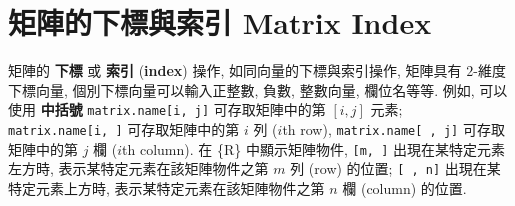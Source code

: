 \documentclass[
]{book}
\begin{document}
\hypertarget{ux77e9ux9663ux7684ux4e0bux6a19ux8207ux7d22ux5f15-matrix-index}{%
\section{矩陣的下標與索引 Matrix Index}\label{ux77e9ux9663ux7684ux4e0bux6a19ux8207ux7d22ux5f15-matrix-index}}

矩陣的
\textbf{下標}
或
\textbf{索引}
(\textbf{index})
操作,
如同向量的下標與索引操作,
矩陣具有 \(2\)-維度下標向量,
個別下標向量可以輸入正整數, 負數, 整數向量, 欄位名等等.
例如, 可以使用
\textbf{中括號}
\texttt{matrix.name{[}i,\ j{]}}
可存取矩陣中的第 \([i, j]\) 元素;
\texttt{matrix.name{[}i,\ {]}}
可存取矩陣中的第 \(i\) 列 (\(i\)th row),
\texttt{matrix.name{[}\ ,\ j{]}}
可存取矩陣中的第 \(j\) 欄 (\(i\)th column).
在 \{R\} 中顯示矩陣物件,
\texttt{{[}m,\ {]}}
出現在某特定元素左方時,
表示某特定元素在該矩陣物件之第 \(m\) 列 (row) 的位置;
\texttt{{[}\ ,\ n{]}}
出現在某特定元素上方時,
表示某特定元素在該矩陣物件之第 \(n\) 欄 (column) 的位置.
\end{document}
